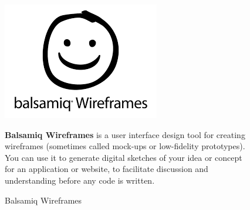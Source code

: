 \begin{figure}[h]
\centering
\begin{minipage}{0.3\textwidth}
    \centering
    \includegraphics[width=\linewidth,frame]{figures/balsamiq.png}
    \caption{Balsamiq Wireframes}
\end{minipage}
\hfill
\begin{minipage}{0.6\textwidth}
   \textbf{Balsamiq Wireframes} is a user interface design tool for creating wireframes (sometimes called mock-ups or low-fidelity prototypes). You can use it to generate digital sketches of your idea or concept for an application or website, to facilitate discussion and understanding before any code is written.\cite{samplewebs11}
\end{minipage}
\end{figure}


